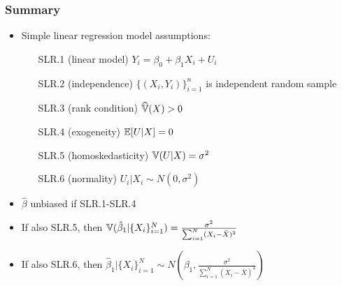 \begin{frame}[allowframebreaks] \frametitle{Summary}
  \begin{itemize}
  \item Simple linear regression model assumptions:
    \begin{enumerate}
    \item[SLR.1] (linear model) $ Y_i = \beta_0 + \beta_1 X_i + U_i $
    \item[SLR.2] (independence) $\{(X_i,Y_i)\}_{i=1}^n$ is independent random
      sample
    \item[SLR.3] (rank condition) $\widehat{\mathbb{V}}(X) > 0$
    \item[SLR.4] (exogeneity) $\mathbb{E}[U | X] = 0$
    \item[SLR.5] (homoskedasticity) $\mathbb{V}(U | X) =
      \sigma^2$
    \item[SLR.6] (normality) $U_i|X_i \sim N(0,\sigma^2)$
    \end{enumerate}
  \item $\hat{\beta}$ unbiased if SLR.1-SLR.4
  \item If also SLR.5, then $\mathbb{V}(\hat{\beta}_1 | \{X_i\}_{i=1}^N ) =
    \frac{\sigma^2}{\sum_{i=1}^N (X_i - \bar{X})^2}$ 
  \item If also SLR.6, then $\hat{\beta}_1|\{X_i\}_{i=1}^N \sim
    N\left(\beta_1, \frac{\sigma^2}{\sum_{i=1}^N (X_i - \bar{X})^2}
    \right)$
  \end{itemize}
\end{frame}

